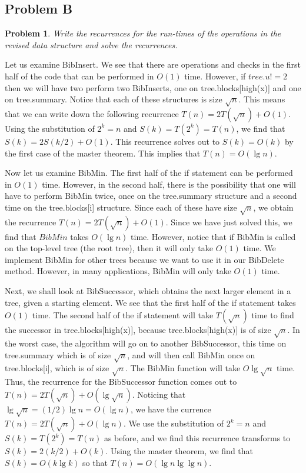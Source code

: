 \documentclass[psamsfonts]{amsart}
\newtheorem{prob}{Problem}[section]
\newenvironment{sol}{{\bfseries Solution}}{\qedsymbol}
\theoremstyle{definition}
\theoremstyle{remark}
\numberwithin{equation}{section}
\begin{document}
\subsection{Problem B}

\begin{prob}
Write the recurrences for the run-times of the operations in the revised data structure and solve the recurrences.
\end{prob}

\begin{sol}
Let us examine BibInsert. We see that there are operations and checks in the first half of the code that can be performed in $O(1)$ time. However, if $tree.u != 2$ then we will have two perform two BibInserts, one on tree.blocks[high(x)] and one on tree.summary. Notice that each of these structures is size $\sqrt{n}$. This means that we can write down the following recurrence $T(n) = 2 T(\sqrt{n}) + O(1)$. Using the substitution of $2^k = n$ and $S(k) = T(2^k) = T(n)$, we find that $S(k) = 2 S(k/2) + O(1)$. This recurrence solves out to $S(k) = O(k)$ by the first case of the master theorem. This implies that $T(n) = O(\lg n)$. 

Now let us examine BibMin. The first half of the if statement can be performed in $O(1)$ time. However, in the second half, there is the possibility that one will have to perform BibMin twice, once on the tree.summary structure and a second time on the tree.blocks[i] structure. Since each of these have size $\sqrt{n}$, we obtain the recurrence $T(n) = 2 T(\sqrt{n}) + O(1)$. Since we have just solved this, we find that $BibMin$ takes $O(\lg n)$ time. However, notice that if BibMin is called on the top-level tree (the root tree), then it will only take $O(1)$ time. We implement BibMin for other trees because we want to use it in our BibDelete method. However, in many applications, BibMin will only take $O(1)$ time. 

Next, we shall look at BibSuccessor, which obtains the next larger element in a tree, given a starting element. We see that the first half of the if statement takes $O(1)$ time. The second half of the if statement will take $T(\sqrt{n})$ time to find the successor in tree.blocks[high(x)], because tree.blocks[high(x)] is of size $\sqrt{n}$. In the worst case, the algorithm will go on to another BibSuccessor, this time on tree.summary which is of size $\sqrt{n}$, and will then call BibMin once on tree.blocks[i], which is of size $\sqrt{n}$. The BibMin function will take $O{\lg \sqrt{n}}$ time. Thus, the recurrence for the BibSuccessor function comes out to $T(n) = 2T(\sqrt{n}) + O(\lg \sqrt{n})$. Noticing that $\lg \sqrt{n} = (1/2) \lg n = O(\lg n)$, we have the currence $T(n) = 2 T(\sqrt{n}) + O (\lg n)$. We use the substitution of $2^k = n$ and $S(k) = T(2^k) = T(n)$ as before, and we find this recurrence transforms to $S(k) = 2(k/2) + O(k)$. Using the master theorem, we find that $S(k) = O( k \lg k)$ so that $T(n) = O(\lg n \lg \lg n)$.  


\end{sol}
\end{document}
